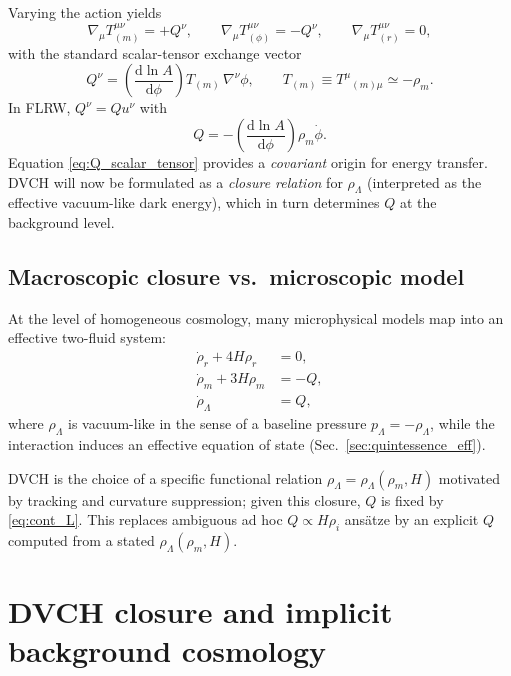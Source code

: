 \documentclass[pdflatex,sn-mathphys-num]{sn-jnl}%
\newcommand{\dd}{\mathrm{d}}
\begin{document}
Varying the action yields
\begin{equation}
\nabla_\mu T^{\mu\nu}_{(m)} = +Q^\nu,\qquad
\nabla_\mu T^{\mu\nu}_{(\phi)} = -Q^\nu,\qquad
\nabla_\mu T^{\mu\nu}_{(r)}=0,
\end{equation}
with the standard scalar-tensor exchange vector
\begin{equation}
Q^\nu = \left(\frac{\dd \ln A}{\dd\phi}\right)T_{(m)}\,\nabla^\nu\phi,
\qquad T_{(m)} \equiv T^{\mu}{}_{(m)\mu}\simeq -\rho_m.
\label{eq:Qvec_scalar_tensor}
\end{equation}
In FLRW, $Q^\nu = Q u^\nu$ with
\begin{equation}
Q = -\left(\frac{\dd \ln A}{\dd\phi}\right)\rho_m \dot\phi.
\label{eq:Q_scalar_tensor}
\end{equation}
Equation \eqref{eq:Q_scalar_tensor} provides a \emph{covariant} origin for
energy transfer. DVCH will now be formulated as a \emph{closure relation}
for $\rho_\Lambda$ (interpreted as the effective vacuum-like dark energy),
which in turn determines $Q$ at the background level.

\subsection{Macroscopic closure vs.\ microscopic model}
\label{subsec:closure_philosophy}

At the level of homogeneous cosmology, many microphysical models map into an
effective two-fluid system:
\begin{align}
\dot\rho_r + 4H\rho_r &= 0,
\label{eq:cont_r}\\
\dot\rho_m + 3H\rho_m &= -Q,
\label{eq:cont_m}\\
\dot\rho_\Lambda &= Q,
\label{eq:cont_L}
\end{align}
where $\rho_\Lambda$ is vacuum-like in the sense of a baseline pressure
$p_\Lambda=-\rho_\Lambda$, while the interaction induces an effective
equation of state (Sec.~\ref{sec:quintessence_eff}).

DVCH is the choice of a specific functional relation
$\rho_\Lambda=\rho_\Lambda(\rho_m,H)$ motivated by tracking and curvature
suppression; given this closure, $Q$ is fixed by \eqref{eq:cont_L}. This
replaces ambiguous ad hoc $Q\propto H\rho_i$ ans\"atze by an explicit $Q$
computed from a stated $\rho_\Lambda(\rho_m,H)$.

\section{DVCH closure and implicit background cosmology}
\label{sec:background}
\end{document}
